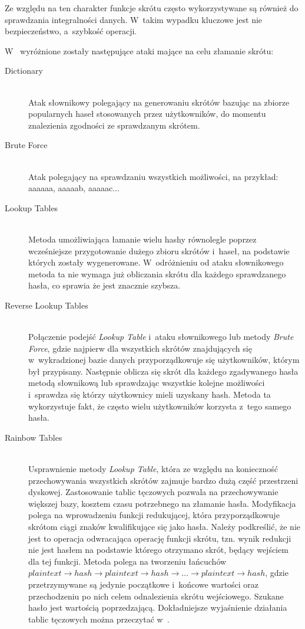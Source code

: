 \documentclass[11pt]{aghdpl}
\begin{document}
Ze względu na ten charakter funkcje skrótu często wykorzystywane są również do sprawdzania integralności danych. W~takim wypadku kluczowe jest nie bezpieczeństwo, a~szybkość operacji.

W~\cite{CSH} wyróżnione zostały następujące ataki mające na celu złamanie skrótu:
\begin{description}
\item[Dictionary] \hfill \\
Atak słownikowy polegający na generowaniu skrótów bazując na zbiorze popularnych haseł stosowanych przez użytkowników, do momentu znalezienia zgodności ze sprawdzanym skrótem.
\item[Brute Force] \hfill \\
Atak polegający na sprawdzaniu wszystkich możliwości, na przykład: aaaaaa, aaaaab, aaaaac...
\item[Lookup Tables] \hfill \\
Metoda umożliwiająca łamanie wielu hashy równolegle poprzez wcześniejsze przygotowanie dużego zbioru skrótów i~haseł, na podstawie których zostały wygenerowane. W~odróżnieniu od ataku słownikowego metoda ta nie wymaga już obliczania skrótu dla każdego sprawdzanego hasła, co sprawia że jest znacznie szybsza.
\item[Reverse Lookup Tables] \hfill \\
Połączenie podejść \emph{Lookup Table} i~ataku słownikowego lub metody \emph{Brute Force}, gdzie najpierw dla wszystkich skrótów znajdujących się w~wykradzionej bazie danych przyporządkowuje się użytkowników, którym był przypisany. Następnie oblicza się skrót dla każdego zgadywanego hasła metodą słownikową lub sprawdzając wszystkie kolejne możliwości i~sprawdza się którzy użytkownicy mieli uzyskany hash. Metoda ta wykorzystuje fakt, że często wielu użytkowników korzysta z~tego samego hasła.
\item[Rainbow Tables] \hfill \\
Usprawnienie metody \emph{Lookup Table}, która ze względu na konieczność przechowywania wszystkich skrótów zajmuje bardzo dużą część przestrzeni dyskowej. Zastosowanie tablic tęczowych pozwala na przechowywanie większej bazy, kosztem czasu potrzebnego na złamanie hasła. Modyfikacja polega na wprowadzeniu funkcji redukującej, która przyporządkowuje skrótom ciągi znaków kwalifikujące się jako hasła. Należy podkreślić, że nie jest to operacja odwracająca operację funkcji skrótu, tzn. wynik redukcji nie jest hasłem na podstawie którego otrzymano skrót, będący wejściem dla tej funkcji. Metoda polega na tworzeniu łańcuchów $plaintext \rightarrow hash \rightarrow plaintext \rightarrow hash \rightarrow \ldots \rightarrow plaintext \rightarrow hash$, gdzie przetrzymywane są jedynie początkowe i~końcowe wartości oraz przechodzeniu po nich celem odnalezienia skrótu wejściowego. Szukane hasło jest wartością poprzedzającą. Dokładniejsze wyjaśnienie działania tablic tęczowych można przeczytać w~\cite{RT}.
\end{description}
\end{document}
